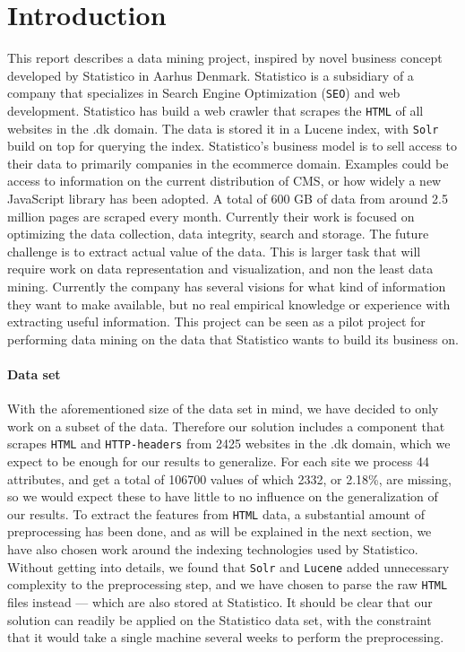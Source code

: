\section{Introduction}
\label{sec:introduction}

This report describes a data mining project, inspired by novel business concept developed by Statistico in Aarhus Denmark. Statistico is a subsidiary of a company that specializes in Search Engine Optimization (\texttt{SEO}) and web development. Statistico has build a web crawler that scrapes the \texttt{HTML} of all websites in the .dk domain. The data is stored it in a Lucene \cite{lucene} index, with \texttt{Solr} \cite{solr} build on top for querying the index. Statistico's business model is to sell access to their data to primarily companies in the ecommerce domain. Examples could be access to information on the current distribution of CMS, or how widely a new JavaScript library has been adopted. A total of 600 GB of data from around 2.5 million pages are scraped every month. Currently their work is focused on optimizing the data collection, data integrity, search and storage.
The future challenge is to extract actual value of the data. This is larger task that will require work on data representation and visualization, and non the least data mining. Currently the company has several visions for what kind of information they want to make available, but no real empirical knowledge or experience with extracting useful information. This project can be seen as a pilot project for performing data mining on the data that Statistico wants to build its business on.

\paragraph{Data set}
\label{subsec:data_set}
With the aforementioned size of the data set in mind, we have decided to only work on a subset of the data. Therefore our solution includes a component that scrapes \texttt{HTML} and \texttt{HTTP-headers} from 2425 websites in the .dk domain, which we expect to be enough for our results to generalize. For each site we process 44 attributes, and get a total of 106700 values of which 2332, or 2.18\%, are missing, so we would expect these to have little to no influence on the generalization of our results. To extract the features from \texttt{HTML} data, a substantial amount of preprocessing has been done, and as will be explained in the next section, we have also chosen work around the indexing technologies used by Statistico. Without getting into details, we found that \texttt{Solr} and \texttt{Lucene} added unnecessary complexity to the preprocessing step, and we have chosen to parse the raw \texttt{HTML} files instead --- which are also stored at Statistico. It should be clear that our solution can readily be applied on the Statistico data set, with the constraint that it would take a single machine several weeks to perform the preprocessing.

